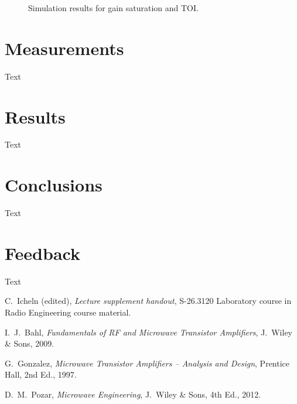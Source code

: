 \documentclass[a4paper, 12pt]{article}
\begin{document}
\begin{figure}[!h]

\caption{Simulation results for gain saturation and TOI.}
\label{f:hb}
\end{figure}

\newpage
\section{Measurements}

Text

\newpage
\section{Results}

Text

\newpage
\section{Conclusions}

Text

\newpage
\section{Feedback}

Text


\newpage
\begin{thebibliography}{9}%
	
 C.\ Icheln (edited), 
	\textit{Lecture supplement handout},
	S-26.3120 Laboratory course in Radio Engineering course material.
	
 I.\ J.\ Bahl, 
	\textit{Fundamentals of RF and Microwave Transistor Amplifiers},
	J.\ Wiley \& Sons, 2009.

 G.\ Gonzalez, 
	\textit{Microwave Transistor Amplifiers -- Analysis and Design},
	Prentice Hall, 2nd Ed., 1997.
	
 D.\ M.\ Pozar, 
	\textit{Microwave Engineering}, 
	J.\ Wiley \& Sons, 4th Ed., 2012.

\end{thebibliography}
\end{document}
